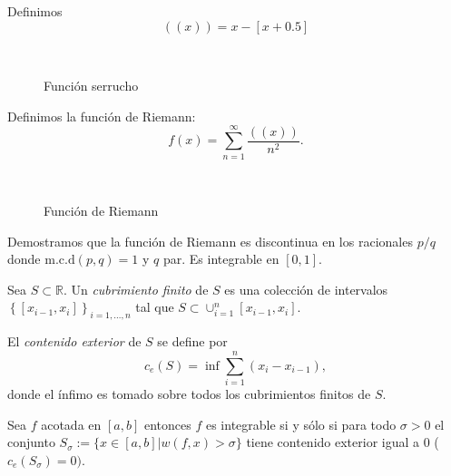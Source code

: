 \begin{ejemplo}{} Definimos
\[
 ((x))=x-[x+0.5]
\]

\begin{figure}[H]
\begin{center}
\\
 \caption{Función serrucho}
\end{center}
 \end{figure}


Definimos la función de Riemann:
\[
 f(x)=\sum_{n=1}^{\infty}\frac{((x))}{n^2}.
\]

\begin{figure}[H]
\begin{center}
\\
\caption{Función de Riemann}
 \end{center}
 \end{figure}
 
Demostramos que la función de Riemann es discontinua en los racionales $p/q$ donde $\text{m.c.d}(p,q)=1$ y $q$ par. Es integrable en $[0,1]$.  
 
\end{ejemplo}



 \begin{definicion}{} Sea $S\subset\mathbb{R}$. Un \emph{cubrimiento finito} de $S$ es una colección de intervalos $\left\{ [x_{i-1},x_i]\right\}_{i=1,\ldots,n}$ tal que $S\subset \cup_{i=1}^n[x_{i-1},x_i]$.
 
 El \emph{contenido exterior} de $S$ se define por 
 \[
  c_e(S)=\inf \sum_{i=1}^n (x_i-x_{i-1}),
 \]
donde el ínfimo es tomado sobre todos los cubrimientos finitos de $S$.
  
 \end{definicion}
 
 \begin{teorema}{}  Sea $f$ acotada en $[a,b]$ entonces $f$ es integrable si y sólo si para todo $\sigma>0$ el conjunto $S_{\sigma}:=\{x\in [a,b]| w(f,x)>\sigma\}$ tiene contenido exterior igual a $0$ ($c_e(S_{\sigma})=0)$.
   \end{teorema}

